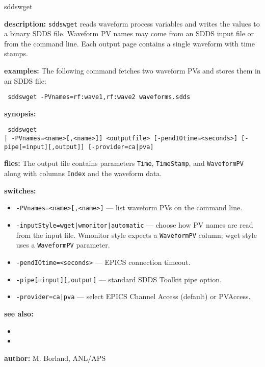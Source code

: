 \begin{sddsprog}{sddswget}
\item \textbf{description:}
  \verb+sddswget+ reads waveform process variables and writes the values to a binary SDDS file.  Waveform PV names may come from an SDDS input file or from the command line.  Each output page contains a single waveform with time stamps.

\item \textbf{examples:}
  The following command fetches two waveform PVs and stores them in an SDDS file:
  \begin{flushleft}{\tt
  sddswget -PVnames=rf:wave1,rf:wave2 waveforms.sdds
  }\end{flushleft}

\item \textbf{synopsis:}
  \begin{flushleft}{\tt
  sddswget\\\relax
      [<inputfile> [-inputStyle={wget|wmonitor|automatic}] | -PVnames=<name>[,<name>]]\
      <outputfile> [-pendIOtime=<seconds>] [-pipe[=input][,output]]\
      [-provider={ca|pva}]\
  }\end{flushleft}

\item \textbf{files:}
  The output file contains parameters \verb+Time+, \verb+TimeStamp+, and \verb+WaveformPV+ along with columns \verb+Index+ and the waveform data.

\item \textbf{switches:}
  \begin{itemize}
    \item {\tt -PVnames=<name>[,<name>]} --- list waveform PVs on the command line.
    \item {\tt -inputStyle={wget|wmonitor|automatic}} --- choose how PV names are read from the input file.  Wmonitor style expects a \verb+WaveformPV+ column; wget style uses a \verb+WaveformPV+ parameter.
    \item {\tt -pendIOtime=<seconds>} --- EPICS connection timeout.
    \item {\tt -pipe[=input][,output]} --- standard SDDS Toolkit pipe option.
    \item {\tt -provider={ca|pva}} --- select EPICS Channel Access (default) or PVAccess.
  \end{itemize}

\item \textbf{see also:}
  \begin{itemize}
    \item {}
    \item {}
  \end{itemize}

\item \textbf{author:} M. Borland, ANL/APS
\end{sddsprog}

